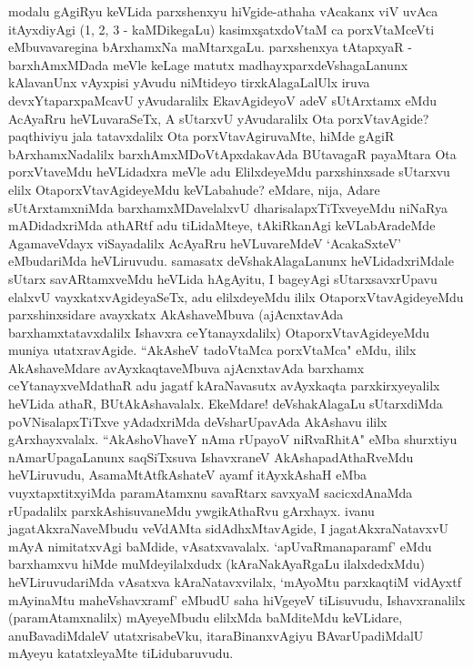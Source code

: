 \begin{artha}
modalu gAgiRyu keVLida parxshenxyu hiVgide-athaha vAcakanx viV uvAca \mdash  itAyxdiyAgi (1, 2, 3 - kaMDikegaLu) kasimx\c satxdoVtaM ca porxVtaMceVti eMbuvavaregina bArxhamxNa maMtarxgaLu. parxshenxya tAtapxyaR - barxhAmxMDada meVle keLage matutx madhayxparxdeVshagaLanunx kAlavanUnx vAyxpisi yAvudu niMtideyo tirxkAlagaLalUlx iruva devxYtaparxpaMcavU yAvudaralilx EkavAgideyoV adeV sUtArxtamx eMdu AcAyaRru heVLuvaraSeTx, A sUtarxvU yAvudaralilx Ota porxVtavAgide? paqthiviyu	jala tatavxdalilx Ota porxVtavAgiruvaMte, hiMde gAgiR bArxhamxNadalilx barxhAmxMDoVtApxdakavAda BUtavagaR payaMtara Ota porxVtaveMdu heVLidadxra meVle adu ElilxdeyeMdu parxshinxsade sUtarxvu elilx OtaporxVtavAgideyeMdu keVLabahude? eMdare, nija, Adare sUtArxtamxniMda barxhamxMDavelalxvU dharisalapxTiTxveyeMdu niNaRya mADidadxriMda athARtf adu tiLidaMteye, tAkiRkanAgi keVLabAradeMde AgamaveVdayx viSayadalilx AcAyaRru heVLuvareMdeV `AcakaSxteV' eMbudariMda heVLiruvudu. samasatx deVshakAlagaLanunx heVLidadxriMdale sUtarx savARtamxveMdu heVLida hAgAyitu, I bageyAgi sUtarxsavxrUpavu elalxvU vayxkatxvAgideyaSeTx, adu elilxdeyeMdu ililx OtaporxVtavAgideyeMdu parxshinxsidare avayxkatx AkAshaveMbuva (ajAcnxtavAda barxhamxtatavxdalilx Ishavxra ceYtanayxdalilx) OtaporxVtavAgideyeMdu muniya utatxravAgide. ``AkAsheV tadoVtaMca porxVtaMca" eMdu, ililx AkAshaveMdare avAyxkaqtaveMbuva ajAcnxtavAda barxhamx ceYtanayxveMdathaR adu jagatf kAraNavasutx avAyxkaqta parxkirxyeyalilx heVLida athaR, BUtAkAshavalalx. EkeMdare! deVshakAlagaLu sUtarxdiMda poVNisalapxTiTxve yAdadxriMda deVsharUpavAda AkAshavu ililx gArxhayxvalalx. ``AkAshoVhaveY nAma rUpayoV niRvaRhitA" eMba shurxtiyu nAmarUpagaLanunx saqSiTxsuva IshavxraneV AkAshapadAthaRveMdu heVLiruvudu, AsamaMtAtfkAshateV ayamf itAyxkAshaH eMba vuyxtapxtitxyiMda paramAtamxnu savaRtarx savxyaM sacicxdAnaMda rUpadalilx parxkAshisuvaneMdu ywgikAthaRvu gArxhayx. ivanu jagatAkxraNaveMbudu  veVdAMta sidAdhxMtavAgide, I jagatAkxraNatavxvU mAyA nimitatxvAgi baMdide, vAsatxvavalalx. `apUvaRmanaparamf' eMdu barxhamxvu hiMde muMdeyilalxdudx (kAraNakAyaRgaLu ilalxdedxMdu) heVLiruvudariMda vAsatxva kAraNatavxvilalx, `mAyoMtu parxkaqtiM vidAyxtf mAyinaMtu maheVshavxramf' eMbudU saha hiVgeyeV tiLisuvudu, Ishavxranalilx (paramAtamxnalilx) mAyeyeMbudu elilxMda baMditeMdu keVLidare, anuBavadiMdaleV utatxrisabeVku, itaraBinanxvAgiyu BAvarUpadiMdalU mAyeyu katatxleyaMte tiLidubaruvudu. 
\end{artha}%

